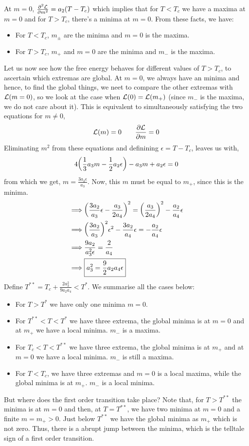 At $m=0$, $\pdv[2]{\mathcal L}{m}  = a_2(T-T_c)$ which implies that for $T<T_c$ we have a maxima at $m=0$ and for $T>T_c$, there's a minima at $m=0$. From these facts, we have: 
\begin{itemize}
    \item For $T<T_c$, $m_\pm$ are the minima and $m=0$ is the maxima.
    \item For $T>T_c$, $m_+$ and $m=0$ are the minima and $m_-$ is the maxima.
\end{itemize}
 Let us now see how the free energy behaves for different values of $T>T_c$, to ascertain which extremas are global. At $m=0$, we always have an minima and hence, to find the global things, we neet to compare the other extremas with $\mathcal L(m=0)$, so we look at the case when $\mathcal L(0) = \mathcal L(m_{+})$ (since $m_-$ is the maxima, we do not care about it). This is equivalent to simultaneously satisfying the two equations for $m\neq 0$, 
 \begin{equation*}
    \mathcal L(m) = 0 \qquad \pdv{\mathcal L}{m} = 0 
 \end{equation*}
 Eliminating $m^2$ from these equations and definining $\epsilon = T-T_c$, leaves us with,
 $$4\qty(\frac{1}{3}a_3 m - \frac{1}{2}a_2\epsilon) - a_3m + a_2\epsilon = 0$$
 from which we get, $m = \frac{3a_2\epsilon}{a_3}$. Now, this $m$ must be equal to $m_+$, since this is the minima.
 \begin{align*}
    \implies& \qty(\frac{3a_2}{a_3}\epsilon -\frac{a_3}{2a_4})^2 = \qty(\frac{a_3}{2a_4})^2 - \frac{a_2}{a_4}\epsilon\\
    \implies& \qty(\frac{3a_2}{a_3})^2\epsilon^2 - \frac{3a_2}{a_4}\epsilon = -\frac{a_2}{a_4}\epsilon \\
    \implies&\frac{9a_2}{a_3^2\epsilon} = \frac{2}{a_4}\\
    \implies& \boxed{a_3^2 = \frac{9}{2}a_2a_4\epsilon}
 \end{align*}
 Define $T^{**} =T_c+ \frac{2a_3^2}{9a_2a_4}<T^*$. We summarise all the cases below:
 \begin{itemize}
    \item For $T>T^*$ we have only one minima $m=0$.
    \item For $T^{**}<T<T^*$ we have three extrema, the global minima is at $m=0$ and at $m_+$ we have a local minima. $m_-$ is a maxima.
    \item For $T_c<T<T^{**}$ we have three extrema, the global minima is at $m_+$ and at $m=0$ we have a local minima.  $m_-$ is still a maxima.
    \item For $T<T_c$, we have three extremas and $m=0$ is a local maxima, while the global minima is at $m_+$.  $m_-$ is a local minima.
 \end{itemize}
 But where does the first order transition take place? Note that, for $T>T^{**}$ the minima is at $m=0$ and then, at $T=T^{**}$, we have two minima at $m=0$ and a finite $m = m_+>0$. Just below $T^{**}$ we have the global minima as $m_+$ which is not zero. Thus, there is a abrupt jump between the minima, which is the telltale sign of a first order transition. 
